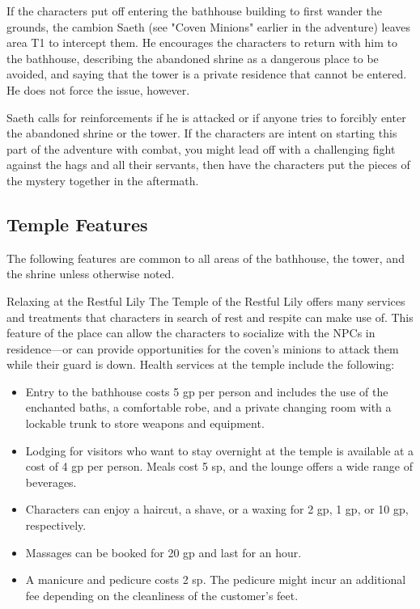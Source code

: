 \documentclass[10pt,a4paper,twoside,bg=print,twocolumn,openany,nodeprecatedcode]{dndbook}
\begin{document}
If the characters put off entering the bathhouse building to first wander the grounds, the cambion Saeth (see "Coven Minions" earlier in the adventure) leaves area T1 to intercept them. He encourages the characters to return with him to the bathhouse, describing the abandoned shrine as a dangerous place to be avoided, and saying that the tower is a private residence that cannot be entered. He does not force the issue, however.

Saeth calls for reinforcements if he is attacked or if anyone tries to forcibly enter the abandoned shrine or the tower. If the characters are intent on starting this part of the adventure with combat, you might lead off with a challenging fight against the hags and all their servants, then have the characters put the pieces of the mystery together in the aftermath.

\subsection{Temple Features}
The following features are common to all areas of the bathhouse, the tower, and the shrine unless otherwise noted.

\begin{DndSidebar}[float=!b]{Relaxing at the Restful Lily}
The Temple of the Restful Lily offers many services and treatments that characters in search of rest and respite can make use of. This feature of the place can allow the characters to socialize with the NPCs in residence—or can provide opportunities for the coven's minions to attack them while their guard is down. Health services at the temple include the following:




\begin{itemize}
\item Entry to the bathhouse costs 5 gp per person and includes the use of the enchanted baths, a comfortable robe, and a private changing room with a lockable trunk to store weapons and equipment.
\item Lodging for visitors who want to stay overnight at the temple is available at a cost of 4 gp per person. Meals cost 5 sp, and the lounge offers a wide range of beverages.
\item Characters can enjoy a haircut, a shave, or a waxing for 2 gp, 1 gp, or 10 gp, respectively.
\item Massages can be booked for 20 gp and last for an hour.
\item A manicure and pedicure costs 2 sp. The pedicure might incur an additional fee depending on the cleanliness of the customer's feet.
\end{itemize}



\end{DndSidebar}
\end{document}
